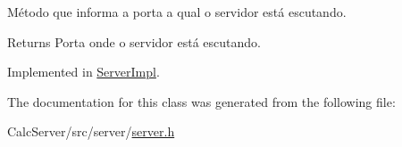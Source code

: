 Método que informa a porta a qual o servidor está escutando. 

\begin{DoxyReturn}{Returns}
Porta onde o servidor está escutando. 
\end{DoxyReturn}


Implemented in \hyperlink{classServerImpl_a769680151e32d74aeae35dfbb1dcbde0}{Server\+Impl}.



The documentation for this class was generated from the following file\+:\begin{DoxyCompactItemize}
\item 
Calc\+Server/src/server/\hyperlink{server_8h}{server.\+h}\end{DoxyCompactItemize}

